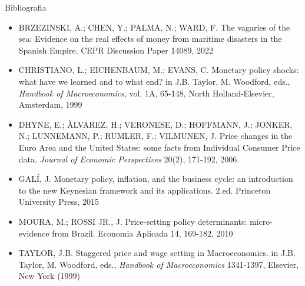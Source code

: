 \documentclass[10pt]{beamer}
\begin{document}
\begin{frame}{ Bibliografia}
    \begin{itemize}
        \item BRZEZINSKI, A.; CHEN, Y.; PALMA, N.; WARD, F. The vagaries of the sea: Evidence on the real effects of money from maritime disasters in the Spanish Empire, CEPR Discussion Paper 14089, 2022\medskip
        \item CHRISTIANO, L.; EICHENBAUM, M.; EVANS, C. Monetary policy shocks: what have we learned and to what end? in J.B. Taylor, M. Woodford, eds., \emph{Handbook of Macroeconomics}, vol. 1A, 65-148, North Holland-Elsevier, Amsterdam, 1999\medskip
        \item DHYNE, E.; ÀLVAREZ, H.; VERONESE, D.; HOFFMANN, J.; JONKER, N.; LUNNEMANN, P.; RUMLER, F.; VILMUNEN, J. Price changes in the Euro Area and the United States: some facts from Individual Consumer Price data. \emph{Journal of Economic Perspectives} 20(2), 171-192, 2006.\medskip
        \item GALÍ, J. Monetary policy, inflation, and the business cycle: an introduction to the new Keynesian framework and its applications. 2.ed. Princeton University Press, 2015\medskip
        \item MOURA, M.; ROSSI JR., J. Price-setting policy determinants: micro-evidence from Brazil. Economia Aplicada 14, 169-182, 2010\medskip
        \item TAYLOR, J.B. Staggered price and wage setting in Macroeconomics. in J.B. Taylor, M. Woodford, eds., \emph{Handbook of Macroeconomics} 1341-1397, Elsevier, New York (1999)        
    \end{itemize}
\end{frame}
\end{document}
